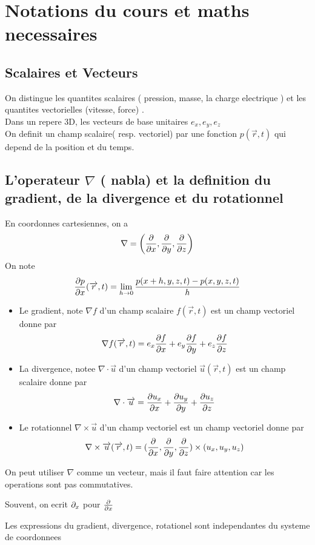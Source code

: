 \documentclass[../main.tex]{subfiles}
\begin{document}
\section{Notations du cours et maths necessaires}
\subsection{Scalaires et Vecteurs}
On distingue les quantites scalaires  ( pression, masse, la charge electrique ) et les quantites vectorielles (vitesse, force) .\\
Dans un repere 3D, les vecteurs de base unitaires $e_x, e_y, e_z$\\
On definit un champ scalaire( resp. vectoriel)  par une fonction $p( \vec{r},t) $ qui depend de la position et du temps.
\subsection{L'operateur $\nabla$ ( nabla) et la definition du gradient, de la divergence et du rotationnel}
En coordonnes cartesiennes, on a
\[ 
	\nabla = \left( \frac{\partial}{\partial x},\frac{\partial}{\partial y}, \frac{\partial}{\partial z}\right) 
\]
On note
\[ 
	\frac{\partial p}{\partial x}( \overrightarrow{r},t) = \lim_{h \to 0} \frac{p( x+h,y,z,t) - p( x,y,z,t) }{h}
\]
\begin{itemize}
	\item Le gradient, note $\nabla f$ d'un champ scalaire $f( \vec{r},t) $ est un champ vectoriel donne par
		\[ 
			\nabla f( \overrightarrow{r},t) = e_x \frac{\partial f}{\partial x} + e_y \frac{\partial f}{\partial y} + e_z \frac{\partial f}{\partial z}
		\]
	
	\item La divergence, notee $\nabla \cdot \vec{u}$ d'un champ vectoriel $\vec{u}( \vec{r},t) $ est un champ scalaire donne par
		\[ 
		\nabla \cdot  \overrightarrow{u} = \frac{\partial u_x}{\partial x} + \frac{\partial u_y}{\partial y} + \frac{\partial u_z}{\partial z}
		\]

	\item Le rotationnel $\nabla \times \vec{u}$ d'un champ vectoriel est un champ vectoriel donne par
		\[ 
			\nabla \times \overrightarrow{u}( \overrightarrow{r},t) =( \frac{\partial}{\partial x}, \frac{\partial}{\partial y}, \frac{\partial}{\partial z}) \times ( u_x,u_y,u_z) 
		\]
		
\end{itemize}
\begin{rmq}
On peut utiliser $\nabla$ comme un vecteur, mais il faut faire attention car les operations sont pas commutatives.
\end{rmq}
\begin{rmq}
Souvent, on ecrit $\partial_x$ pour $\frac{\partial}{\partial x}$
\end{rmq}
\begin{rmq}
Les expressions du gradient, divergence, rotationel sont independantes du systeme de coordonnees
\end{rmq}
\end{document}
